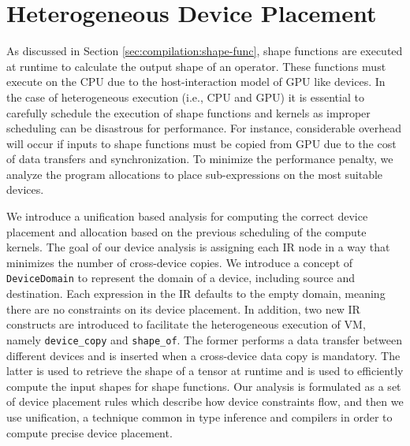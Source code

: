 \section{Heterogeneous Device Placement}
\label{sec:compliation:hetero}
As discussed in Section \autoref{sec:compilation:shape-func}, shape functions are executed at runtime to calculate the output shape of an operator. These functions must execute on the CPU due to the host-interaction model of GPU like devices. In the case of heterogeneous execution (i.e., CPU and GPU) it is essential to carefully schedule the execution of shape functions and kernels as improper scheduling can be disastrous for performance. For instance, considerable overhead will occur if inputs to shape functions must be copied from GPU due to the cost of data transfers and synchronization. To minimize the performance penalty, we analyze the program allocations to place sub-expressions on the most suitable devices.

We introduce a unification based analysis for computing the correct device placement and allocation based on the previous scheduling of the compute kernels. The goal of our device analysis is assigning each IR node in a way that minimizes the number of cross-device copies. We introduce a concept of \texttt{DeviceDomain} to represent the domain of a device, including source and destination. Each expression in the IR defaults to the empty domain, meaning there are no constraints on its device placement. In addition, two new IR constructs are introduced to facilitate the heterogeneous execution of VM, namely \verb|device_copy| and \verb|shape_of|. The former performs a data transfer between different devices and is inserted when a cross-device data copy is mandatory. The latter is used to retrieve the shape of a tensor at runtime and is used to efficiently compute the input shapes for shape functions. Our analysis is formulated as a set of device placement rules which describe how device constraints flow, and then we use unification, a technique common in type inference and compilers in order to compute precise device placement.

